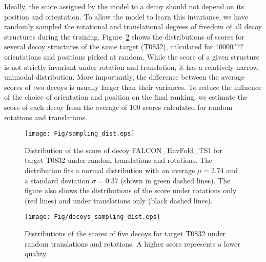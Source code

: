 Ideally, the score assigned by the model to a decoy should not depend
on its position and orientation.  To allow the model to learn this
invariance, we have randomly sampled the rotational and translational
degrees of freedom of all decoy structures during the training.
%
Figure~\ref{Fig:DecoysScoreDistribution} shows the distributions of
scores for several decoy structures of the same target (T0832),
calculated for 10000??? orientations and positions picked at random.
While the score of a given structure is not strictly invariant under
rotation and translation, it has a relatively narrow, unimodal
distribution.
More importantly, the difference between the average scores of two
decoys is usually larger than their variances. To reduce the influence
of the choice of orientation and position on the final ranking, we
estimate the score of each decoy from the average of 100 scores
calculated for random rotations and translations.




\begin{figure}[H]
    \centering
    \texttt{[image: Fig/sampling\_dist.eps]}
%
    \caption{Distribution of the score of decoy FALCON\_EnvFold\_TS1
    for target T0832 under random translations and rotations. The
    distribution fits a normal distribution with an average $\mu =
    2.74$ and a standard deviation $\sigma = 0.37$ (shown in green
    dashed lines). The figure also shows the distributions of the
    score under rotations only (red lines) and under translations only
    (black dashed lines).}
%
    \label{Fig:ScoreDistribution}
\end{figure}

\begin{figure}[H]
    \centering
    \texttt{[image: Fig/decoys\_sampling\_dist.eps]}
%
    \caption{Distributions of the scores of five decoys for target
    T0832 under random translations and rotations. A higher score
    represents a lower quality.}
%
    \label{Fig:DecoysScoreDistribution}
\end{figure}

